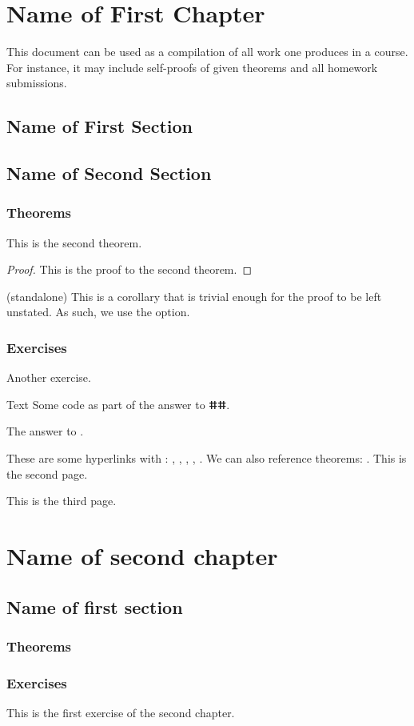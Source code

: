 \documentclass[11pt, a4paper]{book}
\begin{document}
\frontmatter
%

%
\tableofcontents
\thispagestyle{empty}
\newpage
\setcounter{page}{1}
%
\mainmatter
\chapter{Name of First Chapter}
This document can be used as a compilation of all work one produces in a course. For instance, it may include self-proofs of given theorems and all homework submissions.
%
\section{Name of First Section}
%
\section{Name of Second Section}
\subsection{Theorems}
\begin{theorem}
    This is the second theorem.
\end{theorem}
\begin{proof}
    This is the proof to the second theorem.
\end{proof}
\begin{corollary}(standalone)
    This is a corollary that is trivial enough for the proof to be left unstated. As such, we use the  option.
\end{corollary}
\subsection{Exercises}
\begin{exercise}\label{ex:1.2}
    Another exercise.
\end{exercise}
\begin{code}{Text}
    Some code as part of the answer to ⵌⵌ.
\end{code}
\begin{answer}
    The answer to .
\end{answer}
These are some hyperlinks with : , , , , . We can also reference theorems: . 
\newpage
This is the second page.

\newpage
This is the third page.
%
%
\chapter{Name of second chapter}
%
\section{Name of first section}
\subsection{Theorems}
\subsection{Exercises}
\begin{exercise}
    This is the first exercise of the second chapter.
\end{exercise}
\backmatter
\end{document}
